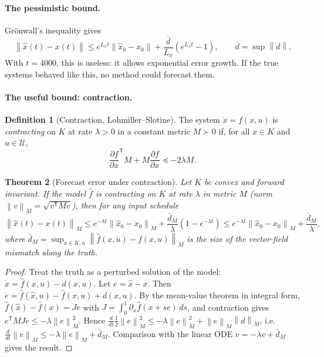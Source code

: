 \documentclass[11pt]{article}
\theoremstyle{plain}
\newtheorem{theorem}{Theorem}[section]
\theoremstyle{definition}
\newtheorem{definition}[theorem]{Definition}
\theoremstyle{remark}
\newcommand{\norm}[1]{\left\lVert #1 \right\rVert}
\newcommand{\tr}{\mathsf{T}}
\begin{document}
\paragraph{The pessimistic bound.} Grönwall's inequality gives
\begin{equation}\label{eq:gronwall}
\norm{\hat x(t)-x(t)}\le e^{L_xt}\norm{\hat x_0-x_0}+\frac{\bar d}{L_x}\left(e^{L_xt}-1\right),\qquad \bar d=\sup\norm{d}.
\end{equation}
With $t=4000$, this is useless: it allows exponential error growth. If the true systems behaved like this, no method could forecast them.

\paragraph{The useful bound: contraction.}
\begin{definition}[Contraction, Lohmiller--Slotine]
The system $\dot x=f(x,u)$ is \emph{contracting} on $K$ at rate $\lambda>0$ in a constant metric $M\succ0$ if, for all $x\in K$ and $u\in\mathcal U$,
\[
\frac{\partial f}{\partial x}^{\!\tr}M+M\frac{\partial f}{\partial x}\preceq-2\lambda M.
\]
\end{definition}
\begin{theorem}[Forecast error under contraction]\label{thm:contraction}
Let $K$ be convex and forward invariant. If the \emph{model} $\hat f$ is contracting on $K$ at rate $\lambda$ in metric $M$ (norm $\norm{v}_M=\sqrt{v^\tr Mv}$), then for any input schedule
\[
\norm{\hat x(t)-x(t)}_M\le e^{-\lambda t}\norm{\hat x_0-x_0}_M+\frac{\bar d_M}{\lambda}\left(1-e^{-\lambda t}\right)\le e^{-\lambda t}\norm{\hat x_0-x_0}_M+\frac{\bar d_M}{\lambda},
\]
where $\bar d_M=\sup_{x\in K,u}\norm{\hat f(x,u)-f(x,u)}_M$ is the size of the vector-field mismatch along the truth.
\end{theorem}
\begin{proof}
Treat the truth as a perturbed solution of the model: $\dot x=\hat f(x,u)-d(x,u)$. Let $e=\hat x-x$. Then $\dot e=\hat f(\hat x,u)-\hat f(x,u)+d(x,u)$. By the mean-value theorem in integral form, $\hat f(\hat x)-\hat f(x)=J e$ with $J=\int_0^1\partial_x\hat f(x+se)\,ds$, and contraction gives $e^\tr M J e\le-\lambda\norm{e}_M^2$. Hence
$\tfrac{d}{dt}\tfrac12\norm{e}_M^2\le-\lambda\norm{e}_M^2+\norm{e}_M\norm{d}_M$, i.e.\ $\tfrac{d}{dt}\norm{e}_M\le-\lambda\norm{e}_M+\bar d_M$. Comparison with the linear ODE $\dot v=-\lambda v+\bar d_M$ gives the result.
\end{proof}
\end{document}
